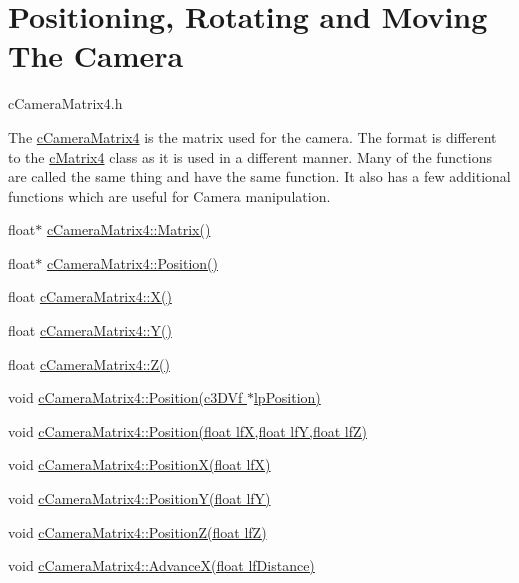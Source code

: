\hypertarget{_reference_lists_CameraMatrixUsagePage}{}\section{Positioning, Rotating and Moving The Camera}\label{_reference_lists_CameraMatrixUsagePage}
cCameraMatrix4.h \par
 The \hyperlink{classc_camera_matrix4}{cCameraMatrix4} is the matrix used for the camera. The format is different to the \hyperlink{classc_matrix4}{cMatrix4} class as it is used in a different manner. Many of the functions are called the same thing and have the same function. It also has a few additional functions which are useful for Camera manipulation. \par
 \par
 float$\ast$ \hyperlink{classc_camera_matrix4_ad8aad043cd8c21d5323b56cbcc90ef78}{cCameraMatrix4::Matrix()} \par
 float$\ast$ \hyperlink{classc_camera_matrix4_a89fba901320f6dda9a6b92bac09db915}{cCameraMatrix4::Position()} \par
 \par
 float \hyperlink{classc_camera_matrix4_a0133c16b734fa93e767ea89964799fb5}{cCameraMatrix4::X()} \par
 float \hyperlink{classc_camera_matrix4_aec72cb78c62b2e0970824262b0b4aa1f}{cCameraMatrix4::Y()} \par
 float \hyperlink{classc_camera_matrix4_a7e3030fcedbd3b74270b26ea2b61904c}{cCameraMatrix4::Z()} \par
 \par
 void \hyperlink{classc_camera_matrix4_a7110b0f3aa924a2cfefe8ca149e0b41f}{cCameraMatrix4::Position(c3DVf $\ast$lpPosition)} \par
 void \hyperlink{classc_camera_matrix4_a1aa471464a30ce27fe339b743b840516}{cCameraMatrix4::Position(float lfX,float lfY,float lfZ)} \par
 void \hyperlink{classc_camera_matrix4_af130ddef040458f01b9a2365f41c567a}{cCameraMatrix4::PositionX(float lfX)} \par
 void \hyperlink{classc_camera_matrix4_adce3f6365faf3af907994f50c004c736}{cCameraMatrix4::PositionY(float lfY)} \par
 void \hyperlink{classc_camera_matrix4_a6ea814a92ce2d7fcc1ba66490127b2f2}{cCameraMatrix4::PositionZ(float lfZ)} \par
 \par
 void \hyperlink{classc_camera_matrix4_a4a07cdf5cb578378193487a1ac304380}{cCameraMatrix4::AdvanceX(float lfDistance)} \par
